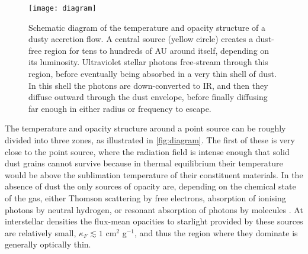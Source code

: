 \documentclass[useAMS,usenatbib]{mn2e}
\begin{document}
\begin{figure}
\texttt{[image: diagram]}
\caption{
\label{fig:diagram}
Schematic diagram of the temperature and opacity structure of a dusty accretion flow. A central source (yellow circle) creates a dust-free region for tens to hundreds of AU around itself, depending on its luminosity. Ultraviolet stellar photons free-stream through this region, before eventually being absorbed in a very thin shell of dust. In this shell the photons are down-converted to IR, and then they diffuse outward through the dust envelope, before finally diffusing far enough in either radius or frequency to escape.
}
\end{figure}

The temperature and opacity structure around a point source can be roughly divided into three zones, as illustrated in \autoref{fig:diagram}. The first of these is very close to the point source, where the radiation field is intense enough that solid dust grains cannot survive because in thermal equilibrium their temperature would be above the sublimation temperature of their constituent materials. In the absence of dust the only sources of opacity are, depending on the chemical state of the gas, either Thomson scattering by free electrons, absorption of ionising photons by neutral hydrogen, or resonant absorption of photons by molecules \citep[e.g.,][]{malygin14a}. At interstellar densities the flux-mean opacities to starlight provided by these sources are relatively small, $\kappa_F \lesssim 1$ cm$^2$ g$^{-1}$, and thus the region where they dominate is generally optically thin.
\end{document}
